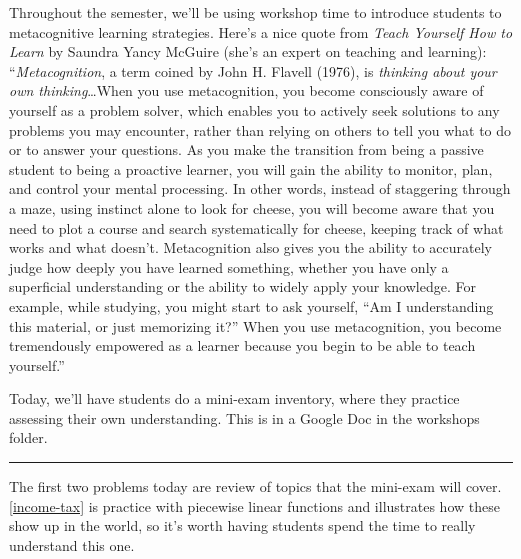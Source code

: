 \documentclass{article}
\begin{document}

\begin{workshop}
  Throughout the semester, we'll be using workshop time to introduce students to metacognitive learning strategies. Here's a nice quote from \emph{Teach Yourself How to Learn} by Saundra Yancy McGuire (she's an expert on teaching and learning): ``\emph{Metacognition}, a term coined by John H. Flavell (1976), is \emph{thinking about your own thinking}\ldots When you use metacognition, you become consciously aware of yourself as a problem solver, which enables you to actively seek solutions to any problems you may encounter, rather than relying on others to tell you what to do or to answer your questions. As you make the transition from being a passive student to being a proactive learner, you will gain the ability to monitor, plan, and control your mental processing. In other words, instead of staggering through a maze, using instinct alone to look for cheese, you will become aware that you need to plot a course and search systematically for cheese, keeping track of what works and what doesn’t. Metacognition also gives you the ability to accurately judge how deeply you have learned something, whether you have only a superficial understanding or the ability to widely apply your knowledge. For example, while studying, you might start to ask yourself, “Am I understanding this material, or just memorizing it?” When you use metacognition, you become tremendously empowered as a learner because you begin to be able to teach yourself.''

  Today, we'll have students do a mini-exam inventory, where they practice assessing their own understanding. This is in a Google Doc in the workshops folder. 

  \begin{center}
    \rule{5in}{0.4pt}
  \end{center}

  The first two problems today are review of topics that the mini-exam will cover. \ref{income-tax} is practice with piecewise linear functions and  illustrates how these show up in the world, so it's worth having students spend the time to really understand this one.
\end{workshop}
\end{document}
